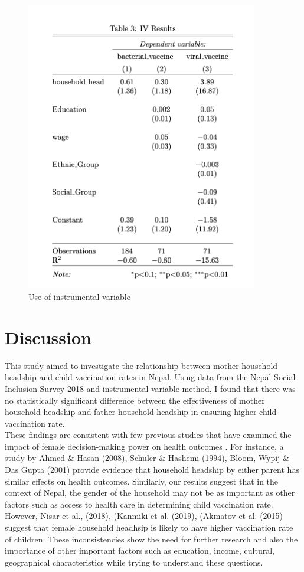 \documentclass[12pt]{article}
\begin{document}
\begin{figure}[H]
    \centering
    \includegraphics[width=0.9\textwidth]{viral_vaccination.png}
    \caption{Use of instrumental variable}
    \label{Table of Summary Statistics}
\end{figure}
\section{Discussion}
This study aimed to investigate the relationship between mother household headship and child vaccination rates in Nepal. Using data from the Nepal Social Inclusion Survey 2018 and instrumental variable method, I found that there was no statistically significant difference between the effectiveness of mother household headship and father household headship in ensuring higher child vaccination rate.\\
These findings are consistent with few previous studies that have examined the impact of female decision-making power on health outcomes . For instance, a study by Ahmed \& Hasan (2008), Schuler \& Hashemi (1994), Bloom, Wypij \& Das Gupta (2001) provide evidence that household headship by either parent has similar effects on health outcomes. Similarly, our results suggest that in the context of Nepal, the gender of the household may not be as important as other factors such as access to health care in determining child vaccination rate. However, Nisar et al., (2018), (Kanmiki et al. (2019), (Akmatov et al. (2015) suggest that female household headhsip is likely to have higher vaccination rate of children. These inconsistencies show the need for further research and also the importance of other important factors such as education, income, cultural, geographical characteristics while trying to understand these questions.
\end{document}
